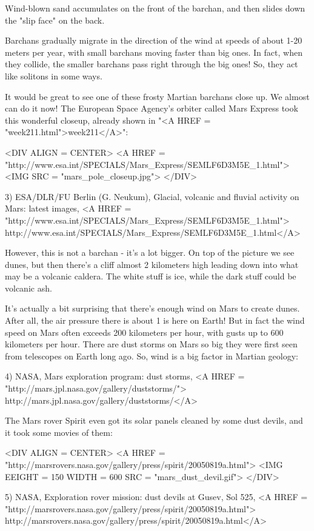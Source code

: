 Wind-blown sand accumulates on the front of the barchan, and then
slides down the "slip face" on the back.

Barchans gradually migrate in the direction of the wind at speeds of
about 1-20 meters per year, with small barchans moving faster than big 
ones.  In fact, when they collide, the smaller barchans pass right 
through the big ones!  So, they act like solitons in some ways.    

It would be great to see one of these frosty Martian barchans close up.
We almost can do it now!  The European Space Agency's orbiter 
called Mars Express took this wonderful closeup, already shown 
in "<A HREF = "week211.html">week211</A>":

<DIV ALIGN = CENTER>
<A HREF = "http://www.esa.int/SPECIALS/Mars_Express/SEMLF6D3M5E_1.html">
<IMG SRC = "mars_pole_closeup.jpg">
</DIV>

3) ESA/DLR/FU Berlin (G. Neukum), 
Glacial, volcanic and fluvial activity on Mars: latest images, 
<A HREF = "http://www.esa.int/SPECIALS/Mars_Express/SEMLF6D3M5E_1.html">
http://www.esa.int/SPECIALS/Mars_Express/SEMLF6D3M5E_1.html</A>

However, this is not a barchan - it's a lot bigger.   On top of 
the picture we see dunes, but then there's a cliff almost 2 kilometers
high leading down into what may be a volcanic caldera.  The white stuff 
is ice, while the dark stuff could be volcanic ash. 

It's actually a bit surprising that there's enough wind on Mars to
create dunes.  After all, the air pressure there is about 1%
is here on Earth!  But in fact the wind speed on Mars often exceeds 
200 kilometers per hour, with gusts up to 600 kilometers per hour.  
There are dust storms on Mars so big they were first seen from 
telescopes on Earth long ago.  So, wind is a big factor in Martian 
geology:

4) NASA, Mars exploration program: dust storms, 
<A HREF = "http://mars.jpl.nasa.gov/gallery/duststorms/">
http://mars.jpl.nasa.gov/gallery/duststorms/</A>

The Mars rover Spirit even got its solar panels cleaned by 
some dust devils, and it took some movies of them:

<DIV ALIGN = CENTER>
<A HREF = "http://marsrovers.nasa.gov/gallery/press/spirit/20050819a.html">
<IMG EEIGHT = 150 WIDTH = 600 SRC = "mars_dust_devil.gif">
</DIV>

5) NASA, Exploration rover mission: dust devils at Gusev, Sol 525,
<A HREF = "http://marsrovers.nasa.gov/gallery/press/spirit/20050819a.html">
http://marsrovers.nasa.gov/gallery/press/spirit/20050819a.html</A>

